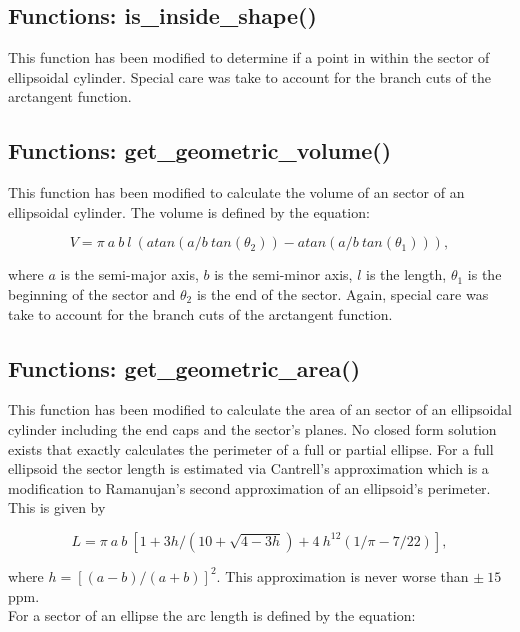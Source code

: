 \documentclass[10pt]{article}
\begin{document}
\subsection{Functions: is\_inside\_shape()}

This function has been modified to determine if a point in within the sector of ellipsoidal cylinder.  Special care was take to account for the branch cuts of the arctangent function.

\subsection{Functions: get\_geometric\_volume()}

This function has been modified to calculate the volume of an sector of an ellipsoidal cylinder.  The volume is defined by the equation:

\begin{equation}
V = \pi ~a ~b ~l ~(atan(a/b~ tan(\theta_2)) - atan(a/b ~tan(\theta_1))),
\end{equation}

\noindent where $a$ is the semi-major axis, $b$ is the semi-minor axis, $l$ is the length, $\theta_1$ is the beginning of the sector and $\theta_2$ is the end of the sector.  Again, special care was take to account for the branch cuts of the arctangent function.

\subsection{Functions: get\_geometric\_area()}

This function has been modified to calculate the area of an sector of an ellipsoidal cylinder including the end caps and the sector's planes.  No closed form solution exists that exactly calculates the perimeter of a full or partial  ellipse.  For a full ellipsoid the sector length is estimated via Cantrell's approximation which is a modification to Ramanujan's second approximation of an ellipsoid's perimeter.  This is given by

\begin{equation}
L = \pi ~a ~b  ~[1 + 3 h/(10 +\sqrt{4-3 h}) + 4 ~h^{12} (1/\pi - 7/22)],
\end{equation}

\noindent where $h = [(a-b)/(a+b)]^2$.  This approximation is never worse than $\pm ~15$ ppm.\\

 For a sector of an ellipse the arc length is defined by the equation:
\end{document}
